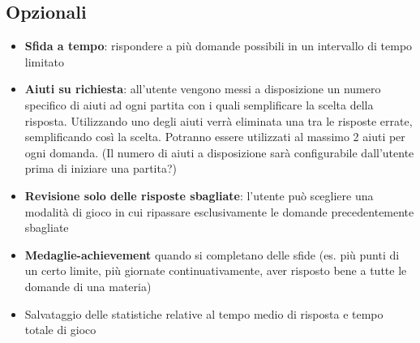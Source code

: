         \subsection{Opzionali}
        \begin{itemize}
            \item \textbf{Sfida a tempo}: rispondere a più domande possibili in un intervallo di tempo limitato
            \item \textbf{Aiuti su richiesta}: all’utente vengono messi a disposizione un numero specifico di aiuti ad ogni partita con i quali semplificare la scelta della risposta. Utilizzando uno degli aiuti verrà eliminata una tra le risposte errate, semplificando così la scelta. Potranno essere utilizzati al massimo 2 aiuti per ogni domanda. (Il numero di aiuti a disposizione sarà configurabile dall'utente prima di iniziare una partita?)
            \item \textbf{Revisione solo delle risposte sbagliate}: l’utente può scegliere una modalità di gioco in cui ripassare esclusivamente le domande precedentemente sbagliate
            \item \textbf{Medaglie-achievement} quando si completano delle sfide (es. più punti di un certo limite, più giornate continuativamente, aver risposto bene a tutte le domande di una materia)
            \item Salvataggio delle statistiche relative al tempo medio di risposta e tempo totale di gioco
        \end{itemize}
